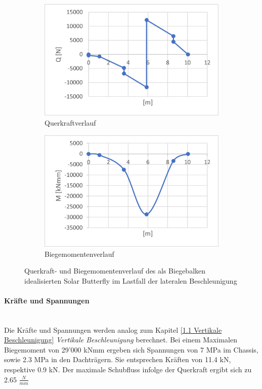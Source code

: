   \begin{figure}[!ht]
    \centering
      \begin{subfigure}{.5\textwidth}
        \centering
        \includegraphics[width=.98\linewidth]{04_figures/1.4 Q.png}
        \caption{Querkraftverlauf}
        \label{1.4 Q}
      \end{subfigure}%
      \begin{subfigure}{.5\textwidth}
        \centering
        \includegraphics[width=.98\linewidth]{04_figures/1.4 M.png}
        \caption{Biegemomentenverlauf}
        \label{1.4 M}
      \end{subfigure}%
    \caption{Querkraft- und Biegemomentenverlauf des als Biegebalken idealisierten Solar Butterfly im Lastfall der lateralen Beschleunigung}
  \label{1.4 QM}
  \end{figure}

  \paragraph{Kräfte und Spannungen}\mbox{}\\
  Die Kräfte und Spannungen werden analog zum Kapitel \ref{1.1 Vertikale Beschleunigung} \emph{Vertikale Beschleunigung} berechnet. Bei einem Maximalen Biegemoment von 29'000 kNmm ergeben sich Spannungen von 7 MPa im Chassis, sowie 2.3 MPa in den Dachträgern. Sie entsprechen Kräften von 11.4 kN, respektive 0.9 kN. Der maximale Schubfluss infolge der Querkraft ergibt sich zu 2.65 $\frac{N}{mm}$

